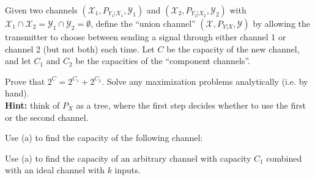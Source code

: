 \documentclass[a4paper,10pt,landscape,twocolumn]{scrartcl}
\begin{document}
\begin{exercise}
Given two channels $(\mathcal{X}_1, P_{Y_1|X_1}, \mathcal{Y}_1)$ and $(\mathcal{X}_2, P_{Y_2|X_2}, \mathcal{Y}_2)$ with $\mathcal{X}_1 \cap \mathcal{X}_2 = \mathcal{Y}_1 \cap \mathcal{Y}_2 = \emptyset$, define the ``union channel'' $(\mathcal{X}, P_{Y|X},\mathcal{Y})$ by allowing the transmitter to choose between sending a signal through either channel 1 or channel 2 (but not both) each time. Let $C$ be the capacity of the new channel, and let $C_1$ and $C_2$ be the capacities of the ``component channels''.
\begin{subex}[(4pt)]
Prove that $2^C = 2^{C_1} + 2^{C_2}$. Solve any maximization problems analytically (i.e. by hand).
\\\textbf{Hint:} think of $P_X$ as a tree, where the first step decides whether to use the first or the second channel.
\end{subex}

\begin{subex}[(1pt)]
Use (a) to find the capacity of the following channel:
\begin{center}
\end{center}
\end{subex}

\begin{subex}[(1pt)]
Use (a) to find the capacity of an arbitrary channel with capacity $C_1$ combined with an ideal channel with $k$ inputs.
\end{subex}
\end{exercise}
\end{document}
